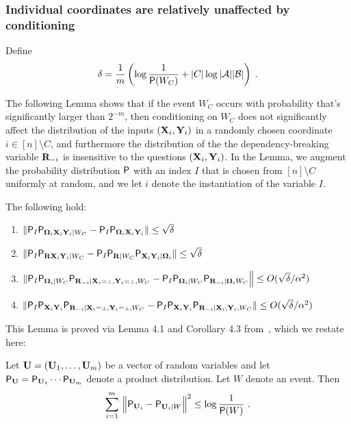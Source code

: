\subsubsection{Individual coordinates are relatively unaffected by conditioning} Define 
\begin{equation}
\label{eq:delta}
	\delta = \frac{1}{m} \left ( \log \frac{1}{\P(W_C)} + |C| \log |\A| |\B| \right)\;.
\end{equation}

The following Lemma shows that if the event $W_C$ occurs with probability that's significantly larger than $2^{-m}$, then conditioning on $W_C$ does not significantly affect the distribution of the inputs $(\bX_i, \bY_i)$ in a randomly chosen coordinate $i \in [n] \setminus C$, and furthermore the distribution of the the dependency-breaking variable $\bR_\mi$ is insensitive to the questions $(\bX_i,\bY_i)$. In the Lemma, we augment the probability distribution $\P$ with an index $I$ that is chosen from $[n] \setminus C$ uniformly at random, and we let $i$ denote the instantiation of the variable $I$.

\begin{lemma}
\label{lem:classical_skew}
The following hold:
\begin{enumerate}
	\item $\| \P_I \P_{\bOmega_i \bX_i \bY_i | W_C} - \P_I \P_{\bOmega_i \bX_i \bY_i} \| \leq \sqrt{\delta}$
	\item $\| \P_I  \P_{\bR \bX_i \bY_i | W_C} - \P_I \P_{\bR |W_C} \P_{\bX_i \bY_i | \bOmega_i } \| \leq \sqrt{\delta}$
	\item $\| \P_I \P_{\bOmega_i |W_C} \P_{\bR_\mi | \bX_i = \dummy, \bY_i = \dummy, W_C} - \P_I \P_{\bOmega_i | W_C} \P_{\bR_\mi |\bOmega_i  W_C}  \Big \| \leq O(\sqrt{\delta}/\alpha^2)$
	\item $\| \P_I \P_{\bX_i \bY_i}  \P_{\bR_\mi | \bX_i = \dummy, \bY_i = \dummy, W_C} - \P_I \P_{\bX_i \bY_i}  \P_{\bR_\mi | \bX_i, \bY_i, W_C} \| \leq O(\sqrt{\delta}/\alpha^2)$
\end{enumerate}
\end{lemma}

This Lemma is proved via Lemma 4.1 and Corollary 4.3 from~\cite{Hol09}, which we restate here:

\begin{lemma}
\label{lem:hol}
Let $\bU = (\bU_1,\ldots,\bU_m)$ be a vector of random variables and let $\P_{\bU} = \P_{\bU_1} \cdots \P_{\bU_m}$ denote a product distribution. Let $W$ denote an event. Then
\[
	\sum_{i=1}^m \, \Big \| \P_{\bU_i} - \P_{\bU_i | W} \Big \|^2 \leq \log \frac{1}{\P(W)}~.
\]
\end{lemma}

